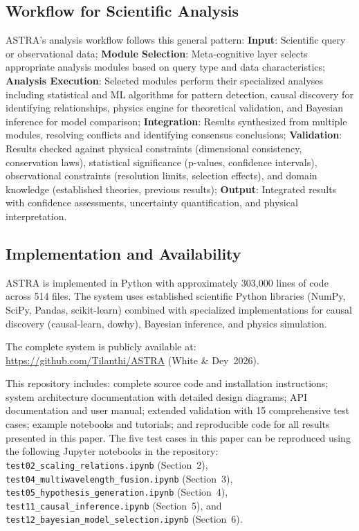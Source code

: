 \documentclass[usenatbib]{rasti}
\begin{document}
\subsection{Workflow for Scientific Analysis}

ASTRA's analysis workflow follows this general pattern: \textbf{Input}: Scientific query or observational data; \textbf{Module Selection}: Meta-cognitive layer selects appropriate analysis modules based on query type and data characteristics; \textbf{Analysis Execution}: Selected modules perform their specialized analyses including statistical and ML algorithms for pattern detection, causal discovery for identifying relationships, physics engine for theoretical validation, and Bayesian inference for model comparison; \textbf{Integration}: Results synthesized from multiple modules, resolving conflicts and identifying consensus conclusions; \textbf{Validation}: Results checked against physical constraints (dimensional consistency, conservation laws), statistical significance (p-values, confidence intervals), observational constraints (resolution limits, selection effects), and domain knowledge (established theories, previous results); \textbf{Output}: Integrated results with confidence assessments, uncertainty quantification, and physical interpretation.

\subsection{Implementation and Availability}

ASTRA is implemented in Python with approximately 303,000 lines of code across 514 files. The system uses established scientific Python libraries (NumPy, SciPy, Pandas, scikit-learn) combined with specialized implementations for causal discovery (causal-learn, dowhy), Bayesian inference, and physics simulation.

The complete system is publicly available at: \url{https://github.com/Tilanthi/ASTRA} (White \& Dey~2026)\cite{astra_github}.

This repository includes: complete source code and installation instructions; system architecture documentation with detailed design diagrams; API documentation and user manual; extended validation with 15 comprehensive test cases; example notebooks and tutorials; and reproducible code for all results presented in this paper. The five test cases in this paper can be reproduced using the following Jupyter notebooks in the repository: \texttt{test02\_scaling\_relations.ipynb} (Section~2), \texttt{test04\_multiwavelength\_fusion.ipynb} (Section~3), \texttt{test05\_hypothesis\_generation.ipynb} (Section~4), \texttt{test11\_causal\_inference.ipynb} (Section~5), and \texttt{test12\_bayesian\_model\_selection.ipynb} (Section~6).
\end{document}
